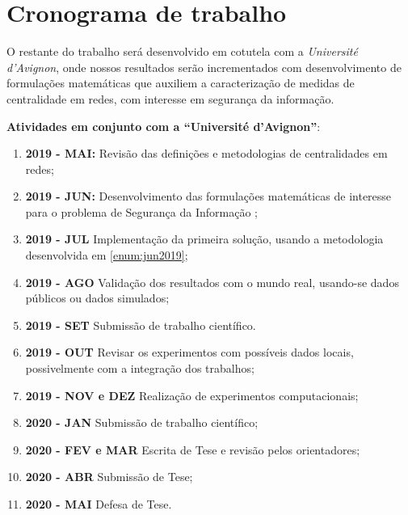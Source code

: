 
\chapter{Cronograma de trabalho}
\label{cap:cronograma}
O restante do trabalho será desenvolvido em cotutela com a \textit{Université d’Avignon}, onde nossos resultados serão incrementados com desenvolvimento de formulações matemáticas que auxiliem a caracterização de medidas de centralidade em redes, com interesse em segurança da informação.

\textbf{Atividades em conjunto com a ``Université d’Avignon''}:
\begin{enumerate}
    \item \textbf{2019 - MAI:} Revisão das definições e metodologias de centralidades em redes;
    \item \textbf{2019 - JUN:} Desenvolvimento das formulações matemáticas de interesse para o problema de Segurança da Informação \label{enum:jun2019};
    \item \textbf{2019 - JUL} Implementação da primeira solução, usando a metodologia desenvolvida em \ref{enum:jun2019};
    \item \textbf{2019 - AGO} Validação dos resultados com o mundo real, usando-se dados públicos ou dados simulados;
    \item \textbf{2019 - SET} Submissão de trabalho científico.
    \item \textbf{2019 - OUT} Revisar os experimentos com possíveis dados locais, possivelmente com a integração dos trabalhos;
    \item \textbf{2019 - NOV e DEZ} Realização de experimentos computacionais;
    \item \textbf{2020 - JAN} Submissão de trabalho científico;
    \item \textbf{2020 - FEV e MAR} Escrita de Tese e revisão pelos orientadores;
    \item \textbf{2020 - ABR} Submissão de Tese;
    \item \textbf{2020 - MAI} Defesa de Tese.
\end{enumerate}
